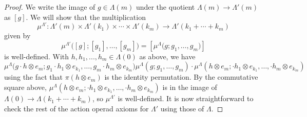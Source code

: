 \documentclass{amsbook} %
\newenvironment{eq*}{\begin{equation*}}{\end{equation*}}
\numberwithin{section}{chapter}
\begin{document}
\begin{proof}
We write the image of $g \in \Lambda(m)$ under the quotient $\Lambda(m) \to \Lambda'(m)$ as $[g]$. We will show that the multiplication
\[
\mu^{\Lambda'}:\Lambda'(m) \times \Lambda'(k_1) \times \cdots \times \Lambda'(k_m) \to \Lambda'(k_1 + \cdots + k_m)
\]
given by 
\[
\mu^{\Lambda'}\Big( [g]; [g_1], \ldots , [g_m] \Big) = [\mu^{\Lambda}\Big(g; g_1, \ldots, g_m \Big)]
\]
is well-defined. With $h, h_1, ..., h_m \in \Lambda(0)$ as above, we have
\[
\mu^{\Lambda}\Big(g \cdot h \otimes e_m; g_1\cdot h_1 \otimes e_{k_1}, \ldots, g_m\cdot h_m \otimes e_{k_m} \Big) \mu^{\Lambda}(g; g_1, \ldots, g_m) \cdot \mu^{\Lambda}(h \otimes e_m; \cdot h_1 \otimes e_{k_1}, \ldots, \cdot h_m \otimes e_{k_m})
\]
using the fact that $\pi(h \otimes e_m)$ is the identity permutation. By the commutative square above, $\mu^{\Lambda}(h \otimes e_m; \cdot h_1 \otimes e_{k_1}, \ldots, \cdot h_m \otimes e_{k_m})$ is in the image of $\Lambda(0) \to \Lambda(k_1 + \cdots + k_m)$, so $\mu^{\Lambda'}$ is well-defined. It is now straightforward to check the rest of the action operad axioms for $\Lambda'$ using those of $\Lambda$.






\end{proof}
\end{document}
